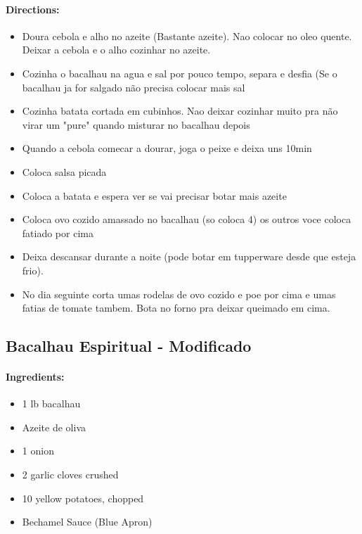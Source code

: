 \documentclass{article}
\begin{document}
\paragraph{Directions:}
\begin{itemize}
	\item Doura cebola e alho no azeite (Bastante azeite). Nao colocar no oleo quente. Deixar a cebola e o alho cozinhar no azeite.
	\item Cozinha o bacalhau na agua e sal por pouco tempo, separa e desfia (Se o bacalhau ja for salgado não precisa colocar mais sal
	\item Cozinha batata cortada em cubinhos. Nao deixar cozinhar muito pra não virar um "pure" quando misturar no bacalhau depois
	\item Quando a cebola comecar a dourar, joga o peixe e deixa uns 10min
	\item Coloca salsa picada
	\item Coloca a batata e espera ver se vai precisar botar mais azeite
	\item Coloca ovo cozido amassado no bacalhau (so coloca 4) os outros voce coloca fatiado por cima
	\item Deixa descansar durante a noite (pode botar em tupperware desde que esteja frio).
	\item No dia seguinte corta umas rodelas de ovo cozido e poe por cima e umas fatias de tomate tambem. Bota no forno pra deixar  queimado em cima.
\end{itemize}

\subsection{Bacalhau Espiritual - Modificado}

\paragraph{Ingredients:}

\begin{itemize}
	\item 1 lb bacalhau
	\item Azeite de oliva
	\item 1 onion
	\item 2 garlic cloves crushed
	\item 10 yellow potatoes, chopped
	\item Bechamel Sauce (Blue Apron)
\end{itemize}
\end{document}

